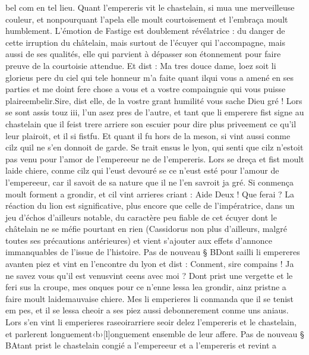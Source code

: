 \documentclass{article}
\begin{document}
\begin{pages}
   bel com en tel lieu. \pend
\pstart Quant l’empereris vit le chastelain, 
   si mua une merveilleuse couleur, et nonpourquant l’apela elle moult courtoisement et l’embraça moult humblement.
   L'émotion de Fastige est doublement révélatrice : du danger de cette irruption du châtelain, mais surtout
   de l'écuyer qui l'accompagne, mais aussi de ses qualités, elle qui parvient à dépasser son étonnement pour faire preuve de la courtoisie 
   attendue.
   Et dist :
   Ma tres douce dame, loez soit li glorieus pere 
      du ciel qui tele honneur m’a faite quant ilqui vous a amené en ses parties 
      et me doint fere chose a vous et a vostre compaingnie qui vous puisse 
      plaireembelir.Sire, dist elle, de la vostre grant humilité vous sache Dieu gré !
   Lors se sont assis touz iii, l’un asez pres de l’autre, et tant que 
   li emperere fist signe au chastelain que il feist trere arriere 
   son escuier pour dire plus priveement ce qu’il leur plairoit, et il si 
   fistfu. Et quant il fu hors de la meson, 
   si vint aussi conme cilz quil ne s’en donnoit de garde. Se trait ensus 
   le lyon, qui senti que cilz n’estoit pas venu pour l’amor de 
   l’empereeur ne de l’empereris. Lors se dreça et 
   fist moult laide chiere, conme cilz qui l’eust devouré se ce n’eust esté pour l’amour de l’empereeur, 
   car il savoit de sa nature que il ne l’en savroit ja gré. Si conmença moult forment a grondir, et cil vint arrieres criant :
   Aide Deux ! Que ferai ?
   La réaction du lion est significative, plus encore que celle de l'impératrice, dans un jeu d'échos d'ailleurs
   notable, du caractère peu fiable de cet écuyer dont le châtelain ne se méfie pourtant en rien (Cassidorus non plus d'ailleurs, malgré
   toutes ses précautions antérieures) et vient s'ajouter aux effets d'annonce immanquables de l'issue de l'histoire. \pend
\pstart Pas de nouveau § BDont sailli 
   li empereres avanten piez et 
   vint en l’encontre du lyon et dist :
   Conment, sire compains ! Ja ne savez vous qu’il 
      est venusvint ceens avec moi ?
   Dont prist une vergette et le feri sus la croupe, mes onques pour ce n’enne lessa 
   lea grondir, 
   ainz pristne a faire moult
   laidemauvaise chiere. 
   Mes li emperieres li conmanda que il se tenist em pes, 
   et il se lessa cheoir a ses piez aussi debonnerement conme uns aniaus. Lors s’en vint li emperieres 
   raseoirarriere seoir delez 
   l’empereris et 
   le chastelain, et parlerent 
   longuement‹b›[l]onguement ensemble de leur affere. \pend
\pstart Pas de nouveau § BAtant prist le chastelain 
   congié a l’empereeur et a l’empereris et revint a 

\end{pages}
\end{document}
